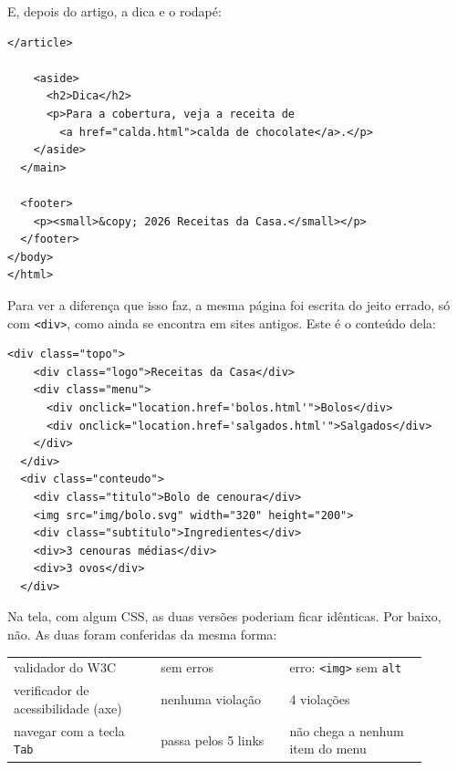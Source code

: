 E, depois do artigo, a dica e o rodapé:

\begin{codigo}
\begin{Verbatim}[breaklines=true, breaksymbolleft={}, fontsize=\footnotesize]
    </article>

    <aside>
      <h2>Dica</h2>
      <p>Para a cobertura, veja a receita de
        <a href="calda.html">calda de chocolate</a>.</p>
    </aside>
  </main>

  <footer>
    <p><small>&copy; 2026 Receitas da Casa.</small></p>
  </footer>
</body>
</html>
\end{Verbatim}
\end{codigo}

Para ver a diferença que isso faz, a mesma página foi escrita do jeito errado, só com \texttt{<div>}, como ainda se encontra em sites antigos. Este é o conteúdo dela:

\begin{codigo}
\begin{Verbatim}[breaklines=true, breaksymbolleft={}, fontsize=\footnotesize]
  <div class="topo">
    <div class="logo">Receitas da Casa</div>
    <div class="menu">
      <div onclick="location.href='bolos.html'">Bolos</div>
      <div onclick="location.href='salgados.html'">Salgados</div>
    </div>
  </div>
  <div class="conteudo">
    <div class="titulo">Bolo de cenoura</div>
    <img src="img/bolo.svg" width="320" height="200">
    <div class="subtitulo">Ingredientes</div>
    <div>3 cenouras médias</div>
    <div>3 ovos</div>
  </div>
\end{Verbatim}
\end{codigo}

Na tela, com algum CSS, as duas versões poderiam ficar idênticas. Por baixo, não. As duas foram conferidas da mesma forma:

\begin{center}
\begin{tabular}{@{}P{0.32\linewidth}P{0.28\linewidth}P{0.3\linewidth}@{}}
\toprule
{}
 &  &  \\
\midrule
validador do W3C & sem erros & erro: \texttt{<img>} sem \texttt{alt} \\
 verificador de acessibilidade (axe) & nenhuma violação & 4 violações \\
navegar com a tecla \texttt{Tab} & passa pelos 5 links & não chega a nenhum item do menu \\
\bottomrule
\end{tabular}
\end{center}

